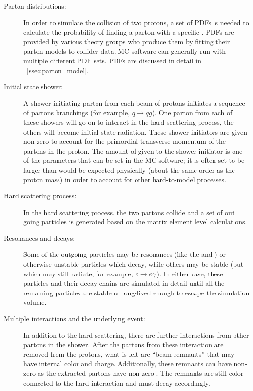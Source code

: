 \begin{description}

    \item[Parton distributions:] In order to simulate the collision of two
        protons, a set of PDFs is needed to calculate the probability of
        finding a parton with a specific . PDFs are provided by
        various theory groups who produce them by fitting their parton models
        to collider data. MC software can generally run with multiple different
        PDF sets. PDFs are discussed in detail in \SEC~\ref{ssec:parton_model}.

    \item[Initial state shower:] A shower-initiating parton from each beam of
        protons initiates a sequence of partons branchings (for example, $q \to
        qg$). One parton from each of these showers will go on to interact in
        the hard scattering process, the others will become initial state
        radiation. These shower initiators are given non-zero \pt to account
        for the primordial transverse momentum of the partons in the proton.
        The amount of \pt given to the shower initiator is one of the
        parameters that can be set in the MC software; it is often set to be
        larger than would be expected physically (about the same order as the
        proton mass) in order to account for other hard-to-model processes.

    \item[Hard scattering process:] In the hard scattering process, the two
        partons collide and a set of out going particles is generated based on
        the matrix element level calculations.

    \item[Resonances and decays:] Some of the outgoing particles may be
        resonances (like the \W and \Z) or otherwise unstable particles which
        decay, while others may be stable (but which may still radiate, for
        example, $e \to e \gamma$). In either case, these particles and their
        decay chains are simulated in detail until all the remaining particles
        are stable or long-lived enough to escape the simulation volume.

    \item[Multiple interactions and the underlying event:] In addition to the
        hard scattering, there are further interactions from other partons in
        the shower. After the partons from these interaction are removed from
        the protons, what is left are ``beam remnants'' that may have internal
        color and charge. Additionally, these remnants can have non-zero \pt as
        the extracted partons have non-zero \pt. The remnants are still color
        connected to the hard interaction and must decay accordingly.


\end{description}
